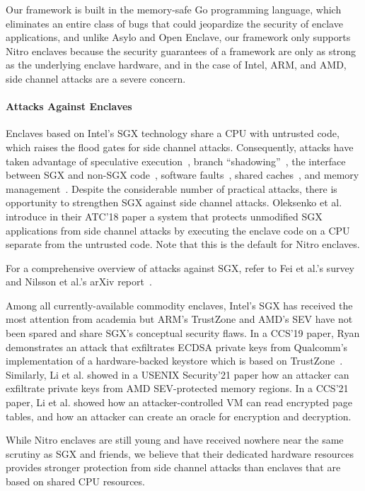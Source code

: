 Our framework is built in the memory-safe Go programming language, which
eliminates an entire class of bugs that could jeopardize the security of
enclave applications, and unlike Asylo and Open Enclave, our framework only
supports Nitro enclaves because the security guarantees of a framework are only
as strong as the underlying enclave hardware, and in the case of Intel, ARM,
and AMD, side channel attacks are a severe concern.

\paragraph{Attacks Against Enclaves}

Enclaves based on Intel's SGX technology share a CPU with untrusted code, which
raises the flood gates for side channel attacks.  Consequently, attacks have
taken advantage of
speculative execution~\cite{VanBulck2018a,VanSchaik2021a},
branch ``shadowing''~\cite{Lee2017b},
the interface between SGX and non-SGX code~\cite{Bulck19a},
software faults~\cite{Murdock2020a},
shared caches~\cite{Brasser2017a},
and memory management~\cite{Wang2017a}.
Despite the considerable number of practical attacks, there is opportunity to
strengthen SGX against side channel attacks.  Oleksenko et al. introduce in
their ATC'18 paper a system that protects unmodified SGX applications from side
channel attacks by executing the enclave code on a CPU separate from the
untrusted code.  Note that this is the default for Nitro enclaves.

For a comprehensive overview of attacks against SGX, refer to Fei et al.'s
survey~\cite{Fei2021a} and Nilsson et al.'s arXiv report~\cite{Nilsson20a}.

Among all currently-available commodity enclaves, Intel's SGX has received the
most attention from academia but ARM's TrustZone and AMD's SEV have not been
spared and share SGX's conceptual security flaws.  In a CCS'19 paper, Ryan
demonstrates an attack that exfiltrates ECDSA private keys from Qualcomm's
implementation of a hardware-backed keystore which is based on
TrustZone~\cite{Ryan2019a}.  Similarly, Li et al. showed in a USENIX
Security'21 paper how an attacker can exfiltrate private keys from AMD
SEV-protected memory regions.  In a CCS'21 paper, Li et al. showed how an
attacker-controlled VM can read encrypted page tables, and how an attacker can
create an oracle for encryption and decryption.

While Nitro enclaves are still young and have received nowhere near the same
scrutiny as SGX and friends, we believe that their dedicated hardware resources
provides stronger protection from side channel attacks than enclaves
that are based on shared CPU resources.
